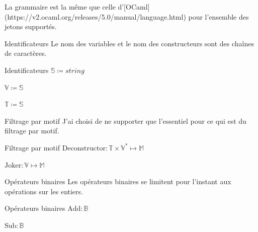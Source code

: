 \documentclass{beamer}
\begin{document}
La grammaire est la même que celle d'[OCaml](https://v2.ocaml.org/releases/5.0/manual/language.html) pour l'ensemble des jetons supportés.

\begin{frame}{Identificateurs}
    Le nom des variables et le nom des constructeurs sont des chaînes de caractères.

    \begin{block}{Identificateurs}
        $\mathbb{S} \coloneqq string$%

        $\mathbb{V} \coloneqq \mathbb{S}$%

        $\mathbb{T} \coloneqq \mathbb{S}$%
    \end{block}
\end{frame}

\begin{frame}{Filtrage par motif}
    J'ai choisi de ne supporter que l'essentiel pour ce qui est du filtrage par motif.%
    
    \begin{block}{Filtrage par motif}
        $\text{Deconstructor} : \mathbb{T} \times \mathbb{V}^{*} \mapsto \mathbb{M}$%

        $\text{Joker} : \mathbb{V} \mapsto \mathbb{M}$%
    \end{block}
\end{frame}

\begin{frame}{Opérateurs binaires}
    Les opérateurs binaires se limitent pour l'instant aux opérations sur les entiers.

    \begin{block}{Opérateurs binaires}
        $\text{Add} : \mathbb{B}$%

        $\text{Sub} : \mathbb{B}$%
    \end{block}
\end{frame}
\end{document}
